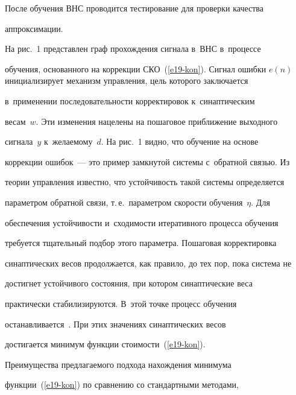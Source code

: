   


  После обучения ВНС проводится тестирование для проверки качества 


аппроксимации.


  


  


  


  На рис.~1 представлен граф прохождения сигнала в~ВНС в~процессе 


обучения, основанного на коррекции СКО~(\ref{e19-kon}). Сигнал ошибки $e 


(n)$ инициализирует механизм управления, цель которого заключается 


в~применении последовательности корректировок к~синаптическим 


весам~$w$. Эти изменения нацелены на пошаговое приближение выходного 


сигнала~$y$ к~желаемому~$d$. На рис.~1 видно, что обучение на основе 


коррекции ошибок~--- это пример замкнутой системы с~обратной связью. Из 


теории управления известно, что устойчивость такой системы определяется 


параметром обратной связи, т.\,е.\ параметром скорости обучения~$\eta$. Для 


обеспечения устойчивости и~сходимости итеративного процесса обуче\-ния 


требуется тщательный подбор этого параметра. Пошаговая корректировка 


синаптических весов продолжается, как правило, до тех пор, пока сис\-те\-ма не 


достигнет устойчивого состояния, при котором синаптические веса 


практически стабилизируются. В~этой точке процесс обуче\-ния 


останавливается~\cite{17-kon}. При этих значениях синаптических весов 


достигается минимум функции стоимости~(\ref{e19-kon}). 


{ %





}


  


  Преимущества предлагаемого подхода нахождения минимума 


функции~(\ref{e19-kon}) по сравнению со стандартными методами, 


